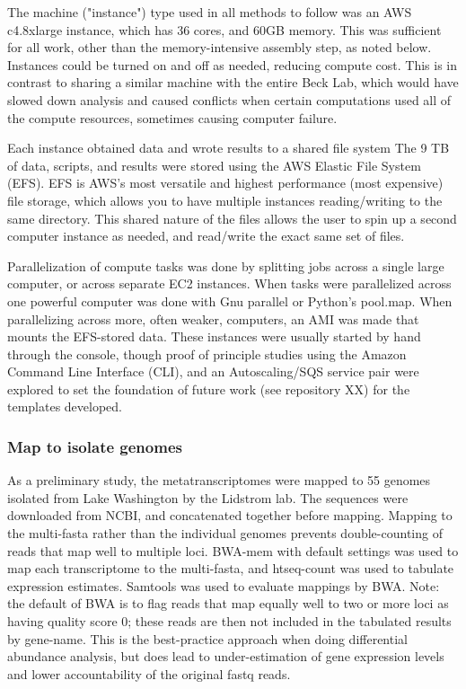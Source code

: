 The machine ("instance") type used in all methods to follow was an AWS c4.8xlarge instance, which has 36 cores, and 60GB memory.
This was sufficient for all work, other than the memory-intensive assembly step, as noted below.
Instances could be turned on and off as needed, reducing compute cost.
This is in contrast to sharing a similar machine with the entire Beck Lab, which would have slowed down analysis and caused conflicts when certain computations used all of the compute resources, sometimes causing computer failure.

Each instance obtained data and wrote results to a shared file system
The 9 TB of data, scripts, and results were stored using the AWS Elastic File System (EFS).
EFS is AWS's most versatile and highest performance (most expensive) file storage, which allows you to have multiple instances reading/writing to the same directory.
This shared nature of the files allows the user to spin up a second computer instance as needed, and read/write the exact same set of files.

Parallelization of compute tasks was done by splitting jobs across a single large computer, or across separate EC2 instances.
When tasks were parallelized across one powerful computer was done with Gnu parallel or Python's pool.map.
When parallelizing across more, often weaker, computers, an AMI was made that mounts the EFS-stored data.
These instances were usually started by hand through the console, though proof of principle studies using the Amazon Command Line Interface (CLI),
    and an Autoscaling/SQS service pair were explored to set the foundation of future work (see repository XX) for the templates developed.

\subsubsection{Map to isolate genomes}
As a preliminary study, the metatranscriptomes were mapped to 55 genomes isolated from Lake Washington by the Lidstrom lab.
The sequences were downloaded from NCBI, and concatenated together before mapping.
Mapping to the multi-fasta rather than the individual genomes prevents double-counting of reads that map well to multiple loci.
BWA-mem \cite{li2009} with default settings was used to map each transcriptome to the multi-fasta, and htseq-count \cite{anders2014} was used to tabulate expression estimates.
Samtools \cite{li2009samtools} was used to evaluate mappings by BWA.
Note: the default of BWA is to flag reads that map equally well to two or more loci as having quality score 0; these reads are then not included in the tabulated results by gene-name.
This is the best-practice approach when doing differential abundance analysis, but does lead to under-estimation of gene expression levels and lower accountability of the original fastq reads. %


